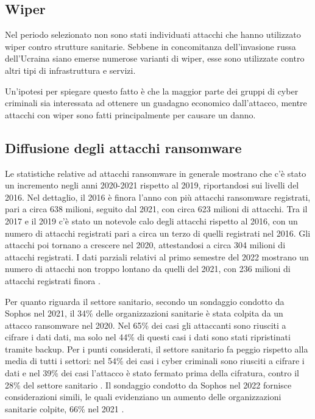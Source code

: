 \documentclass[12pt]{article}
\begin{document}
\subsection{Wiper}
Nel periodo selezionato non sono stati individuati attacchi che hanno utilizzato wiper contro strutture sanitarie. Sebbene in concomitanza dell’invasione russa dell’Ucraina siano emerse numerose varianti di wiper, esse sono utilizzate contro altri tipi di infrastruttura e servizi.

Un’ipotesi per spiegare questo fatto è che la maggior parte dei gruppi di cyber criminali sia interessata ad ottenere un guadagno economico dall'attacco, mentre attacchi con wiper sono fatti principalmente per causare un danno.

\subsection{Diffusione degli attacchi ransomware}

Le statistiche relative ad attacchi ransomware in generale mostrano che c'è stato un incremento negli anni 2020-2021 rispetto al 2019, riportandosi sui livelli del 2016. Nel dettaglio, il 2016 è finora l'anno con più attacchi ransomware registrati, pari a circa 638 milioni, seguito dal 2021, con circa 623 milioni di attacchi. Tra il 2017 e il 2019 c'è stato un notevole calo degli attacchi rispetto al 2016, con un numero di attacchi registrati pari a circa un terzo di quelli registrati nel 2016. Gli attacchi poi tornano a crescere nel 2020, attestandosi a circa 304 milioni di attacchi registrati. I dati parziali relativi al primo semestre del 2022 mostrano un numero di attacchi non troppo lontano da quelli del 2021, con 236 milioni di attacchi registrati finora \cite{noauthor_number_2022}.

Per quanto riguarda il settore sanitario, secondo un sondaggio condotto da Sophos nel 2021, il 34\% delle organizzazioni sanitarie è stata colpita da un attacco ransomware nel 2020. Nel 65\% dei casi gli attaccanti sono riusciti a cifrare i dati dati, ma solo nel 44\% di questi casi i dati sono stati ripristinati tramite backup. Per i punti considerati, il settore sanitario fa peggio rispetto alla media di tutti i settori: nel 54\% dei casi i cyber criminali sono riusciti a cifrare i dati e nel 39\% dei casi l'attacco è stato fermato prima della cifratura, contro il 28\% del settore sanitario \cite{noauthor_sophos_2022-1}.
Il sondaggio condotto da Sophos nel 2022 fornisce considerazioni simili, le quali evidenziano un aumento delle organizzazioni sanitarie colpite, 66\% nel 2021 \cite{noauthor_sophos_2022}.
\end{document}
